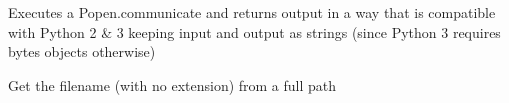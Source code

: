 \documentclass[letterpaper,10pt,english]{sphinxmanual}
\begin{document}

\begin{fulllineitems}
\label{doctree/soprano.utils:soprano.utils.safe_communicate}
Executes a Popen.communicate and returns output in a way that is 
compatible with Python 2 \& 3 keeping input and output as strings (since
Python 3 requires bytes objects otherwise)

\end{fulllineitems}


\begin{fulllineitems}
\label{doctree/soprano.utils:soprano.utils.seedname}
Get the filename (with no extension) from a full path

\end{fulllineitems}

\end{document}
